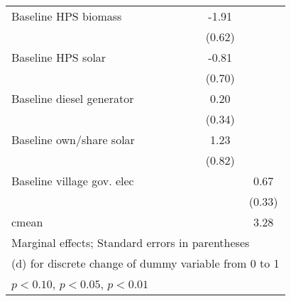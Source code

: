 \begin{table}[htbp]
\begin{tabular*}{1\hsize}{@{\hskip\tabcolsep\extracolsep\fill}l*{6}{c}}
Baseline HPS biomass&                  &                  &                  &                  &    -1.91\sym{***}&                  \\
                &                  &                  &                  &                  &   (0.62)         &                  \\
Baseline HPS solar&                  &                  &                  &                  &    -0.81         &                  \\
                &                  &                  &                  &                  &   (0.70)         &                  \\
Baseline diesel generator&                  &                  &                  &                  &     0.20         &                  \\
                &                  &                  &                  &                  &   (0.34)         &                  \\
Baseline own/share solar&                  &                  &                  &                  &     1.23         &                  \\
                &                  &                  &                  &                  &   (0.82)         &                  \\
Baseline village gov. elec&                  &                  &                  &                  &                  &     0.67\sym{**} \\
                &                  &                  &                  &                  &                  &   (0.33)         \\
\midrule
cmean           &                  &                  &                  &                  &                  &     3.28         \\
\bottomrule
\multicolumn{7}{l}{\footnotesize Marginal effects; Standard errors in parentheses}\\
\multicolumn{7}{l}{\footnotesize  (d) for discrete change of dummy variable from 0 to 1}\\
\multicolumn{7}{l}{\footnotesize \sym{*} \(p<0.10\), \sym{**} \(p<0.05\), \sym{***} \(p<0.01\)}\\
\end{tabular*}
\end{table}
